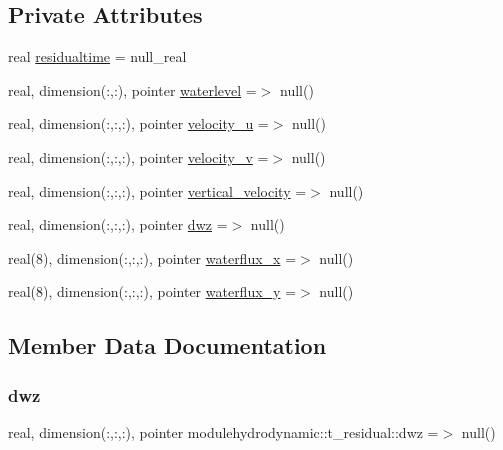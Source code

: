 \subsection*{Private Attributes}
\begin{DoxyCompactItemize}
\item 
real \mbox{\hyperlink{structmodulehydrodynamic_1_1t__residual_a6a186a961028cea99e25cd8512f0c488}{residualtime}} = null\+\_\+real
\item 
real, dimension(\+:,\+:), pointer \mbox{\hyperlink{structmodulehydrodynamic_1_1t__residual_a19218bd82cef60693f5834e24ced983a}{waterlevel}} =$>$ null()
\item 
real, dimension(\+:,\+:,\+:), pointer \mbox{\hyperlink{structmodulehydrodynamic_1_1t__residual_ab4ad9e70ce6b0b5f5076a5c02f30374a}{velocity\+\_\+u}} =$>$ null()
\item 
real, dimension(\+:,\+:,\+:), pointer \mbox{\hyperlink{structmodulehydrodynamic_1_1t__residual_a6c24e50828a31ef952104f4d0501c0a2}{velocity\+\_\+v}} =$>$ null()
\item 
real, dimension(\+:,\+:,\+:), pointer \mbox{\hyperlink{structmodulehydrodynamic_1_1t__residual_a428578ddd0cfd4e711f05f36f63836b6}{vertical\+\_\+velocity}} =$>$ null()
\item 
real, dimension(\+:,\+:,\+:), pointer \mbox{\hyperlink{structmodulehydrodynamic_1_1t__residual_afb952727c0eaa02db952dc7a99d987fb}{dwz}} =$>$ null()
\item 
real(8), dimension(\+:,\+:,\+:), pointer \mbox{\hyperlink{structmodulehydrodynamic_1_1t__residual_a7f6448ebecf2bee2641fd53a8e408e8f}{waterflux\+\_\+x}} =$>$ null()
\item 
real(8), dimension(\+:,\+:,\+:), pointer \mbox{\hyperlink{structmodulehydrodynamic_1_1t__residual_a5454975d230bc2172d4edf5f06324105}{waterflux\+\_\+y}} =$>$ null()
\end{DoxyCompactItemize}


\subsection{Member Data Documentation}
\mbox{\label{structmodulehydrodynamic_1_1t__residual_afb952727c0eaa02db952dc7a99d987fb}} 
\subsubsection{\texorpdfstring{dwz}{dwz}}
{\footnotesize\ttfamily real, dimension(\+:,\+:,\+:), pointer modulehydrodynamic\+::t\+\_\+residual\+::dwz =$>$ null()\hspace{0.3cm}{\ttfamily [private]}}


